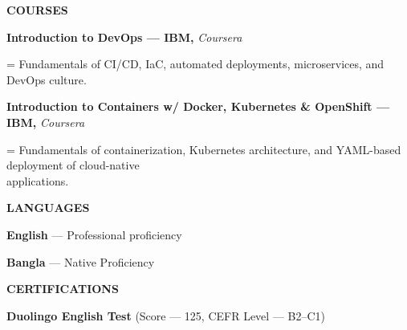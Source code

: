 \documentclass[a4paper]{article}
\newcommand{\sectionfont}{%
  \fontsize{11pt}{13pt}\selectfont\bfseries
}
\newlength{\secondaryindent}
\newcommand{\sectiontitle}[1]{%
  \par
  \vspace{8pt}
  {\sectionfont #1}\par
  \vspace{3pt}
}
\newcommand{\secondaryline}[1]{%
  \par
  \begingroup
  \leftskip=\secondaryindent
  \noindent
  #1\par
  \endgroup
}
\newcommand{\course}[2]{%
  \textbf{#1 --- IBM, }\textit{Coursera}\par
  \secondaryline{#2}%
}
\begin{document}
\sectiontitle{COURSES}

\course
{Introduction to DevOps}
{Fundamentals of CI/CD, IaC, automated deployments, microservices, and DevOps culture.}

\vspace{6pt}

\course
{Introduction to Containers w/ Docker, Kubernetes \& OpenShift}
{Fundamentals of containerization, Kubernetes architecture, and YAML-based deployment of cloud-native\\
  applications.}


\sectiontitle{LANGUAGES}

\textbf{English} --- Professional proficiency\par

\textbf{Bangla} --- Native Proficiency\par


\sectiontitle{CERTIFICATIONS}

\textbf{Duolingo English Test}
(Score --- 125, CEFR Level --- B2--C1)
\end{document}
